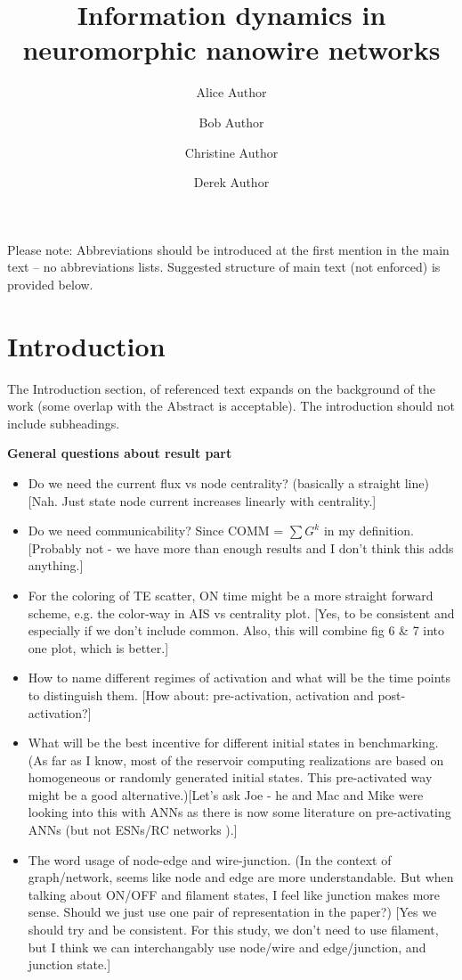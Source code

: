 \documentclass[fleqn,10pt,  amsmath,amssymb,aps]{wlscirep}
\title{Information dynamics in neuromorphic nanowire networks}
\author[1,*]{Alice Author}
\author[2]{Bob Author}
\author[1,2,+]{Christine Author}
\author[2,+]{Derek Author}
\affil[1]{Affiliation, department, city, postcode, country}
\affil[2]{Affiliation, department, city, postcode, country}
\affil[*]{corresponding.author@email.example}
\affil[+]{these authors contributed equally to this work}
\begin{document}
\flushbottom
\maketitle
%
%
\thispagestyle{empty}

\noindent Please note: Abbreviations should be introduced at the first mention in the main text – no abbreviations lists. Suggested structure of main text (not enforced) is provided below.

\section*{Introduction}

The Introduction section, of referenced text expands on the background of the work (some overlap with the Abstract is acceptable). The introduction should not include subheadings.

\clearpage

\textbf{General questions about result part}

\begin{itemize}
	\item Do we need the current flux vs node centrality? (basically a straight line) [Nah. Just state node current increases linearly with centrality.]
	\item Do we need communicability? Since COMM = $\sum G^k$ in my definition.	[Probably not - we have more than enough results and I don't think this adds anything.]
	\item  For the coloring of TE scatter, ON time might be a more straight forward scheme, e.g. the color-way in AIS vs centrality plot. [Yes, to be consistent and especially if we don't include common. Also, this will combine fig 6 \& 7 into one plot, which is better.]
	\item How to name different regimes of activation and what will be the time points to distinguish them. [How about: pre-activation, activation and post-activation?]
	\item What will be the best incentive for different initial states in benchmarking. (As far as I know, most of the reservoir computing realizations are based on homogeneous or randomly generated initial states. This pre-activated way might be a good alternative.)[Let's ask Joe - he and Mac and Mike were looking into this with ANNs as there is now some literature on pre-activating ANNs (but not ESNs/RC networks ).]
	\item The word usage of node-edge and wire-junction. (In the context of graph/network, seems like node and edge are more understandable. But when talking about ON/OFF and filament states, I feel like junction makes more sense. Should we just use one pair of representation in the paper?) [Yes we should try and be consistent. For this study, we don't need to use filament, but I think we can interchangably use node/wire and edge/junction, and junction state.]
\end{itemize}
\end{document}

